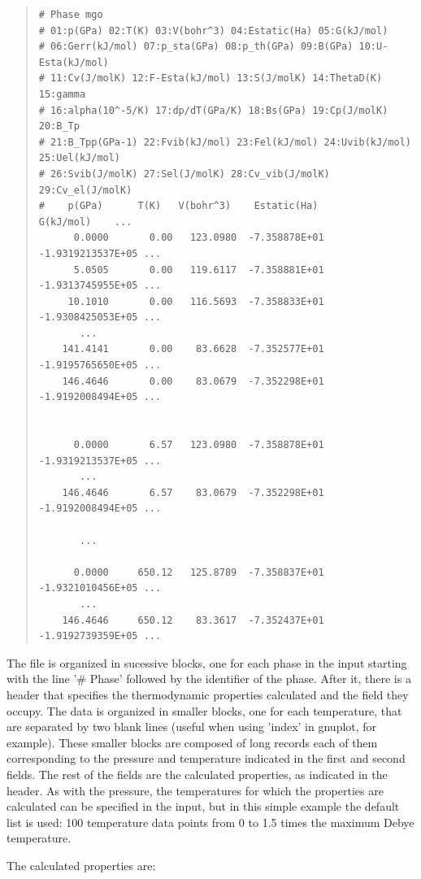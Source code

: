 \documentclass[a4paper]{article}
\begin{document}
\begin{quote}
\begin{verbatim}
# Phase mgo
# 01:p(GPa) 02:T(K) 03:V(bohr^3) 04:Estatic(Ha) 05:G(kJ/mol)
# 06:Gerr(kJ/mol) 07:p_sta(GPa) 08:p_th(GPa) 09:B(GPa) 10:U-Esta(kJ/mol)
# 11:Cv(J/molK) 12:F-Esta(kJ/mol) 13:S(J/molK) 14:ThetaD(K) 15:gamma
# 16:alpha(10^-5/K) 17:dp/dT(GPa/K) 18:Bs(GPa) 19:Cp(J/molK) 20:B_Tp
# 21:B_Tpp(GPa-1) 22:Fvib(kJ/mol) 23:Fel(kJ/mol) 24:Uvib(kJ/mol) 25:Uel(kJ/mol)
# 26:Svib(J/molK) 27:Sel(J/molK) 28:Cv_vib(J/molK) 29:Cv_el(J/molK)
#    p(GPa)      T(K)   V(bohr^3)    Estatic(Ha)        G(kJ/mol)    ...
      0.0000       0.00   123.0980  -7.358878E+01  -1.9319213537E+05 ...
      5.0505       0.00   119.6117  -7.358881E+01  -1.9313745955E+05 ...
     10.1010       0.00   116.5693  -7.358833E+01  -1.9308425053E+05 ...
       ...
    141.4141       0.00    83.6628  -7.352577E+01  -1.9195765650E+05 ...
    146.4646       0.00    83.0679  -7.352298E+01  -1.9192008494E+05 ...


      0.0000       6.57   123.0980  -7.358878E+01  -1.9319213537E+05 ...
       ...
    146.4646       6.57    83.0679  -7.352298E+01  -1.9192008494E+05 ...

       ...

      0.0000     650.12   125.8789  -7.358837E+01  -1.9321010456E+05 ...
       ...
    146.4646     650.12    83.3617  -7.352437E+01  -1.9192739359E+05 ...
\end{verbatim}
\end{quote}

The file is organized in sucessive blocks, one for each phase in the
input starting with the line '\# Phase' followed by the identifier of
the phase. After it, there is a header that specifies the
thermodynamic properties calculated and the field they occupy. The
data is organized in smaller blocks, one for each temperature, that
are separated by two blank lines (useful when using 'index' in
gnuplot, for example). These smaller blocks are composed of long
records each of them corresponding to the pressure and temperature
indicated in the first and second fields. The rest of the fields are
the calculated properties, as indicated in the header. As with the
pressure, the temperatures for which the properties are calculated can
be specified in the input, but in this simple example the default
list is used: 100 temperature data points from 0 to 1.5 times the
maximum Debye temperature.

The calculated properties are:
\end{document}
